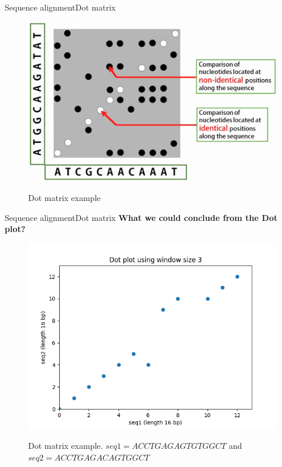 \documentclass[10pt]{beamer}
\begin{document}
{%
\begin{frame}{Sequence alignment}{Dot matrix}
	
	\begin{figure}[]
		\centering
		\includegraphics[width=\textwidth,height=0.7\textheight,keepaspectratio]{img/alignment/dot_plot4.jpg}
		\label{img:uniprot}
		\caption{Dot matrix example}
	\end{figure}
\end{frame}


\begin{frame}{Sequence alignment}{Dot matrix}
	\centering
	\textbf{What we could conclude from the Dot plot?}	 
	\begin{figure}[]		
		\includegraphics[width=\textwidth,height=0.5\textheight,keepaspectratio]{img/alignment/dot_plot1.png}
		\label{img:uniprot}
		\caption{Dot matrix example. $seq1 = ACCTGAGAGTGTGGCT$ and $seq2 = ACCTGAGACAGTGGCT$}
	\end{figure}
\end{frame}

}
\end{document}
